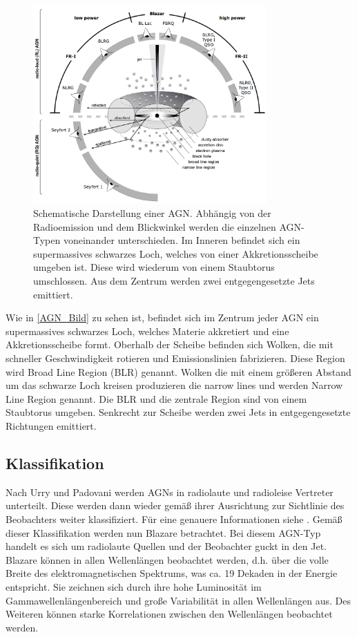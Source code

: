\begin{figure}
    \centering
    \includegraphics[width=0.8\textwidth]{./Plots/02_Astroteilchenphysik/AGN_Schema.png}
    \caption{Schematische Darstellung einer AGN. Abhängig von der Radioemission und dem Blickwinkel werden die einzelnen AGN-Typen voneinander unterschieden.
    Im Inneren befindet sich ein supermassives schwarzes Loch, welches von einer Akkretionsscheibe umgeben ist. 
    Diese wird wiederum von einem Staubtorus umschlossen.
    Aus dem Zentrum werden zwei entgegengesetzte Jets emittiert.\cite{AGNSchema}}
    \label{AGN_Bild}
\end{figure}

Wie in \autoref{AGN_Bild} zu sehen ist, befindet sich im Zentrum jeder AGN ein supermassives schwarzes Loch, welches Materie akkretiert und eine Akkretionsscheibe formt.
Oberhalb der Scheibe befinden sich Wolken, die mit schneller Geschwindigkeit rotieren und Emissionslinien fabrizieren. Diese Region wird Broad Line Region (BLR) genannt.
Wolken die mit einem größeren Abstand um das schwarze Loch kreisen produzieren die narrow lines und werden Narrow Line Region genannt.
Die BLR und die zentrale Region sind von einem Staubtorus umgeben.
Senkrecht zur Scheibe werden zwei Jets in entgegengesetzte Richtungen emittiert.\cite{Weekes}

\subsection{Klassifikation}
Nach Urry und Padovani\cite{Urry_Padovani} werden AGNs in radiolaute und radioleise Vertreter unterteilt. 
Diese werden dann wieder gemäß ihrer Ausrichtung zur Sichtlinie des Beobachters weiter klassifiziert.
Für eine genauere Informationen siehe \cite{Urry_Padovani}.
Gemäß dieser Klassifikation werden nun Blazare betrachtet.
Bei diesem AGN-Typ handelt es sich um radiolaute Quellen und der Beobachter guckt in den Jet. 
Blazare können in allen Wellenlängen beobachtet werden, d.h. über die volle Breite des elektromagnetischen Spektrums, was ca. 19 Dekaden in der Energie entspricht.
Sie zeichnen sich durch ihre hohe Luminosität im Gammawellenlängenbereich und große Variabilität in allen Wellenlängen aus.
Des Weiteren können starke Korrelationen zwischen den Wellenlängen beobachtet werden.\cite{Weekes}

